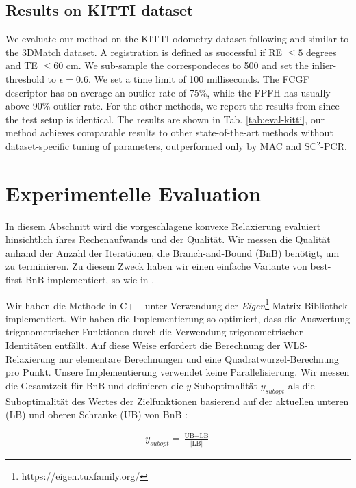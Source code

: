 \subsection{Results on KITTI dataset}


We evaluate our method on the KITTI odometry dataset \cite{Kitti-Geiger2013IJRR} following \cite{SC2-PCR-Chen-2022-CVPR, zhang20233d} and similar to the 3DMatch dataset. A registration is defined as successful if RE $\leq 5$ degrees and TE $\leq 60$ cm.
We sub-sample the correspondeces to 500 and set the inlier-threshold to $\epsilon = 0.6$. We set a time limit of 100 milliseconds. The FCGF \cite{9009829} descriptor has on average an outlier-rate of 75\%, while the FPFH has usually above 90\% outlier-rate. For the other methods, we report the results from \cite{zhang20233d} since the test setup is identical. The results are shown in Tab. \ref{tab:eval-kitti}, our method achieves comparable results to other state-of-the-art methods without dataset-specific tuning of parameters, outperformed only by MAC and SC$^2$-PCR.




\section{Experimentelle Evaluation}

In diesem Abschnitt wird die vorgeschlagene konvexe Relaxierung evaluiert hinsichtlich ihres Rechenaufwands und der Qualität. Wir messen die Qualität anhand der Anzahl der Iterationen, die Branch-and-Bound (BnB) benötigt, um zu terminieren. Zu diesem Zweck haben wir einen einfache Variante von best-first-BnB implementiert, so wie in \cite{10.1007/978-3-642-37444-9_42}.

Wir haben die Methode in C++ unter Verwendung der \textit{Eigen}\footnote{https://eigen.tuxfamily.org/} Matrix-Bibliothek implementiert. Wir haben die Implementierung so optimiert, dass die Auswertung trigonometrischer Funktionen durch die Verwendung trigonometrischer Identitäten entfällt. Auf diese Weise erfordert die Berechnung der WLS-Relaxierung nur elementare Berechnungen und eine Quadratwurzel-Berechnung pro Punkt.
Unsere Implementierung verwendet keine Parallelisierung.
Wir messen die Gesamtzeit für BnB und definieren die $y$-Suboptimalität $y_{subopt}$ als die Suboptimalität des Wertes der Zielfunktionen basierend auf der aktuellen unteren (LB) und oberen Schranke (UB) von BnB \cite{Misener2013}:


\begin{align}
	y_{subopt} = \frac{\text{UB} - \text{LB}}{|\text{LB}|}
\end{align}

